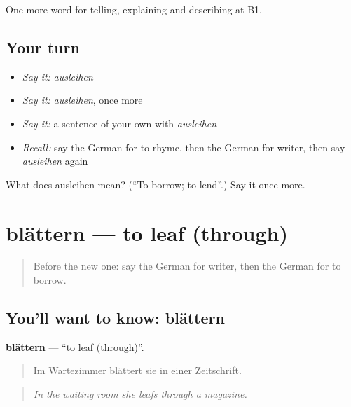 \begin{grammarlens}[title={What you've built}]
One more word for telling, explaining and describing at B1.
\end{grammarlens}

\subsection*{Your turn}
\begin{itemize}
\raggedright
  \item \emph{Say it:} \emph{ausleihen}
  \item \emph{Say it:} \emph{ausleihen}, once more
  \item \emph{Say it:} a sentence of your own with \emph{ausleihen}
  \item \emph{Recall:} say the German for to rhyme, then the German for writer, then say \emph{ausleihen} again
\end{itemize}

\begin{tcolorbox}[breakable,colback=teal!4,colframe=teal!35!black,title={Before you move on}]
What does ausleihen mean? (\textquotedblleft{}To borrow; to lend\textquotedblright{}.) Say it once more.
\end{tcolorbox}
\section[blättern]{blättern — to leaf (through)}

\label{lesson:GE-C522-blaettern}



\begin{quote}
Before the new one: say the German for writer, then the German for to borrow.
\end{quote}

\subsection*{You'll want to know: blättern}
\textbf{blättern} — \textquotedblleft{}to leaf (through)\textquotedblright{}.

\begin{quote}
Im Wartezimmer blättert sie in einer Zeitschrift.
\end{quote}

\begin{quote}
\emph{In the waiting room she leafs through a magazine.}
\end{quote}

